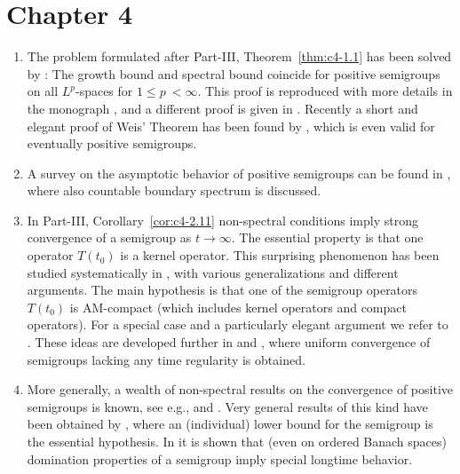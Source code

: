 \section*{Chapter 4}
\begin{enumerate}
\item 
The problem formulated after Part-III, Theorem~\ref{thm:c4-1.1} has been solved by \textcite{zbmath00868262}:
The growth bound and spectral bound coincide for positive semigroups on all $L^{p}$-spaces  for $1 \leq p \ < \infty$. 
This proof is reproduced with more details in the monograph \textcite{zbmath00921898}, and a different proof is given in \textcite[Theorem 5.3.6]{zbmath05842872}.  
Recently a short and elegant proof of Weis' Theorem has been found by \textcite{zbmath07574448}, which is even valid for eventually positive semigroups.

\item 
A survey on the asymptotic behavior of positive semigroups can be found in \textcite{mr4176382}, where also countable boundary spectrum is discussed.


\item 
In Part-III, Corollary~\ref{cor:c4-2.11} non-spectral conditions imply strong convergence of a semigroup as $t \rightarrow \infty$. 
The essential property is that one operator $T(t_0)$ is a kernel operator. 
This surprising phenomenon has been studied systematically in \textcite{zbmath07124949}, with various generalizations and different arguments. 
The main hypothesis is that one of the semigroup operators $T(t_0)$ is AM-compact (which includes kernel operators and compact operators). 
For a special case and a particularly elegant argument we refer to \textcite{zbmath06790441}.
These ideas are developed further in \textcite{zbmath07201923} and \textcite{zbmath07452698}, where uniform convergence of semigroups lacking any time regularity is obtained.

\item 
 More generally, a wealth of non-spectral results on the convergence of positive semigroups is known, see e.g., \textcite{zbmath00482883}  and \textcite{zbmath05080033}. 
 Very general results of this kind have been obtained by \textcite{zbmath06971625}, where an (individual) lower bound for the semigroup is the essential hypothesis.
In \textcite{zbmath07118395} it is shown that (even on ordered Banach spaces) domination properties of a semigroup imply special longtime behavior.


\end{enumerate}
